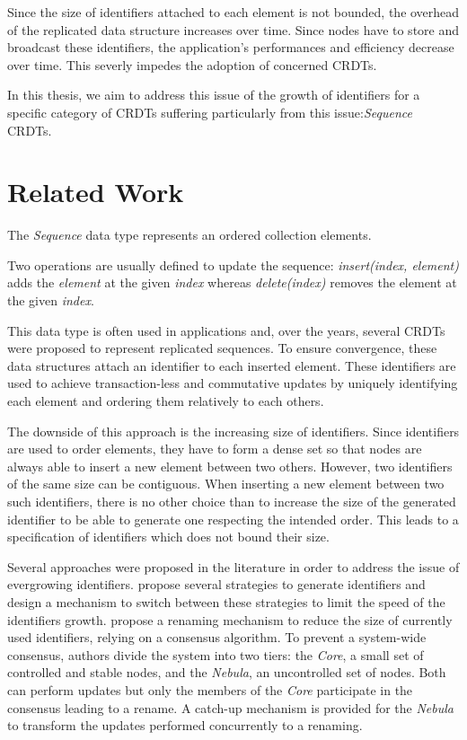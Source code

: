 \documentclass[sigplan]{acmart}
\begin{document}
Since the size of identifiers attached to each element is not bounded, the overhead of the replicated data structure increases over time.
Since nodes have to store and broadcast these identifiers, the application's performances and efficiency decrease over time.
This severly impedes the adoption of concerned \acp{CRDT}.

In this thesis, we aim to address this issue of the growth of identifiers for a specific category of \acp{CRDT} suffering particularly from this issue:\emph{Sequence} \acp{CRDT}.

\section{Related Work}

The \emph{Sequence} data type represents an ordered collection elements.

Two operations are usually defined to update the sequence:
\emph{insert(index, element)} adds the \emph{element} at the given \emph{index}
whereas \emph{delete(index)} removes the element at the given \emph{index}.

This data type is often used in applications and, over the years, several \acp{CRDT} \cite{shapiro:inria-00177693, WeissICDCS09, AndreCollaborateCom2013} were proposed to represent replicated sequences. 
To ensure convergence, these data structures attach an identifier to each inserted element.
These identifiers are used to achieve transaction-less and commutative updates by uniquely identifying each element and ordering them relatively to each others.

The downside of this approach is the increasing size of identifiers.
Since identifiers are used to order elements, they have to form a dense set so that nodes are always able to insert a new element between two others.
However, two identifiers of the same size can be contiguous.
When inserting a new element between two such identifiers, there is no other choice than to increase the size of the generated identifier to be able to generate one respecting the intended order. This leads to a specification of identifiers which does not bound their size.

Several approaches were proposed in the literature in order to address the issue of evergrowing identifiers.
\citet{nedelec_2013_lseq} propose several strategies to generate identifiers and design a mechanism to switch between these strategies to limit the speed of the identifiers growth.
\citet{leia:inria-00397981} propose a renaming mechanism to reduce the size of currently used identifiers, relying on a consensus algorithm.
To prevent a system-wide consensus, authors divide the system into two tiers: the \emph{Core}, a small set of controlled and stable nodes, and the \emph{Nebula}, an uncontrolled set of nodes.
Both can perform updates but only the members of the \emph{Core} participate in the consensus leading to a rename.
A catch-up mechanism is provided for the \emph{Nebula} to transform the updates performed concurrently to a renaming.
\end{document}
